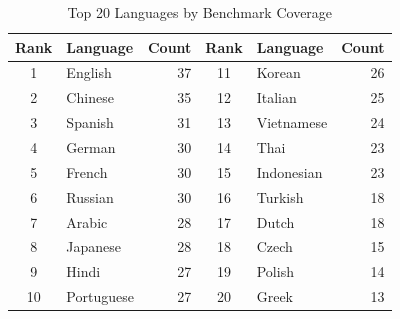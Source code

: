 \begin{table}[t]
\centering
\caption{Top 20 Languages by Benchmark Coverage}
\label{tab:languages}
\begin{tabular}{@{}clr|clr@{}}
\toprule
\textbf{Rank} & \textbf{Language} & \textbf{Count} & \textbf{Rank} & \textbf{Language} & \textbf{Count} \\
\midrule
1 & English & 37 & 11 & Korean & 26 \\
2 & Chinese & 35 & 12 & Italian & 25 \\
3 & Spanish & 31 & 13 & Vietnamese & 24 \\
4 & German & 30 & 14 & Thai & 23 \\
5 & French & 30 & 15 & Indonesian & 23 \\
6 & Russian & 30 & 16 & Turkish & 18 \\
7 & Arabic & 28 & 17 & Dutch & 18 \\
8 & Japanese & 28 & 18 & Czech & 15 \\
9 & Hindi & 27 & 19 & Polish & 14 \\
10 & Portuguese & 27 & 20 & Greek & 13 \\
\bottomrule
\end{tabular}
\end{table}

